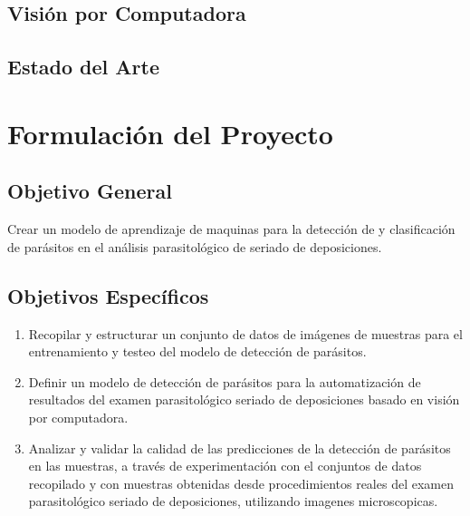 \documentclass[letter,12pt]{report}
\begin{document}
\section{Visión por Computadora}
\blindtext

\section{Estado del Arte}\label{arte}

\chapter{Formulación del Proyecto}\label{formulación}

\section{Objetivo General}
Crear un modelo de aprendizaje de maquinas para la detección de y clasificación de
parásitos en el análisis parasitológico de seriado de deposiciones.

\section{Objetivos Específicos}
\begin{enumerate}\justifying
    \item Recopilar y estructurar un conjunto de datos de imágenes de muestras para el entrenamiento y testeo del modelo de detección de parásitos.
  \item Definir un modelo de detección de parásitos para la automatización de resultados del examen parasitológico seriado de deposiciones basado en visión por computadora.
  \item Analizar y validar la calidad de las predicciones de la detección de parásitos en las muestras, a través de experimentación con el conjuntos de datos recopilado y con muestras obtenidas desde procedimientos reales del examen parasitológico seriado de deposiciones, utilizando imagenes microscopicas.
\end{enumerate}
\end{document}
